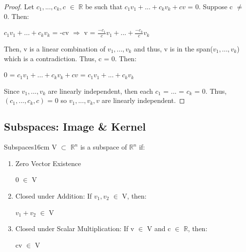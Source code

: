     \begin{proof}
        Let $c_1,...,c_k,c$ $\in$ $\mathbb{R}$ be such that
        $c_1v_1 + ... + c_kv_k + cv$ = 0.
        Suppose c $\not =$ 0. Then:

        \hspace{0.5cm}
        $c_1v_1 + ... + c_kv_k$ = -cv
        \hspace{0.5cm}
        $\Rightarrow$
        \hspace{0.5cm}
        v = $\frac{-c_1}{c}v_1 + ... + \frac{-c_k}{c}v_k$

        Then, v is a linear combination of $v_1,...,v_k$
        and thus, v is in the span($v_1,...,v_k$)
        which is a contradiction. Thus, c = 0. Then:

        \hspace{0.5cm}
        0 = $c_1v_1 + ... + c_kv_k + cv$
        = $c_1v_1 + ... + c_kv_k$

        Since $v_1,...,v_k$ are linearly independent, then
        each $c_1$ = ... = $c_k$ = 0. Thus, $(c_1,...,c_k,c)$ = 0
        so $v_1,...,v_k,v$ are linearly independent.
    \end{proof}

    \newpage





\subsection{ Subspaces: Image \& Kernel }

    \begin{definition}{Subspaces}{16cm}
        V $\subset$ $\mathbb{R}^n$ is a {\color{lblue} subspace}
        of $\mathbb{R}^n$ if:

        \begin{enumerate}[label=(\alph*), leftmargin=1cm, itemsep=0.1cm]
            \item {\color{lgreen} Zero Vector Existence}

                \hspace{0.5cm}
                0 $\in$ V

            \item {\color{lgreen} Closed under Addition}:
                If $v_1,v_2$ $\in$ V, then:

                \hspace{0.5cm}
                $v_1+v_2$ $\in$ V

            \item {\color{lgreen} Closed under Scalar Multiplication}:
                If v $\in$ V and c $\in$ $\mathbb{R}$, then:

                \hspace{0.5cm}
                cv $\in$ V
        \end{enumerate}
    \end{definition}

